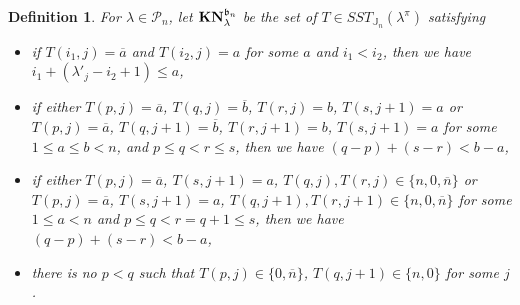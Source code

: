 \documentclass[leqno,11pt]{amsart}
\newtheorem{df}[thm]{\bf Definition}
\numberwithin{equation}{section}
\newcommand{\cP}{\mathscr{P}}
\newcommand{\ov}{\overline}
\newcommand{\mf}{\mathfrak}
\newcommand{\J}{\mathbb{J}}
\newcommand{\la}{\lambda}
\begin{document}
\begin{df}{\rm
For $\la\in \cP_n$, let ${\bf KN}^{\mf b_n}_{\la}$ be the set of $T\in SST_{\J_n}(\la^\pi)$ satisfying
\begin{itemize}
\item[(${\mf b}$-1)] if $T({i_1,j})=\ov{a}$ and $T({i_2,j})=a$ for some $a$ and $i_1< i_2$, then we have $i_1+(\la'_j-i_2+1)\leq a$,


\item[(${\mf b}$-2)] if either $T({p,j})=\ov{a}$, $T({q,j})=\ov{b}$, $T({r,j})=b$, $T({s,j+1})=a$ or 
 $T({p,j})=\ov{a}$, $T({q,j+1})=\ov{b}$, $T({r,j+1})=b$, $T({s,j+1})=a$ for some $1\leq a\leq b< n$, and $p\leq q<r\leq s$, then we have $(q-p)+(s-r)<b-a$,
 
\item[(${\mf b}$-3)] if either $T({p,j})=\ov{a}$, $T({s,j+1})=a$, $T({q,j}), T({r,j})\in \{n,0,\ov{n}\}$ or $T({p,j})=\ov{a}$, $T({s,j+1})=a$, $T({q,j+1}), T({r,j+1})\in \{n,0,\ov{n}\}$ for some $1\leq a< n$ and $p\leq q<r=q+1\leq s$, then we have $(q-p)+(s-r)<b-a$,
 
\item[(${\mf b}$-4)] there is no $p<q$ such that $T(p,j)\in\{0,\ov{n}\}$, $T(q,j+1) \in \{n,0\}$ for some $j$.
   
\end{itemize}}
\end{df}
\end{document}
